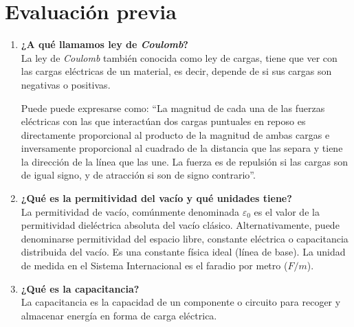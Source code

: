 \documentclass[letter,11pt]{article}
\begin{document}
\section{Evaluación previa}
\begin{enumerate}
\item \textbf{¿A qué llamamos ley de \emph{Coulomb}?} \\
La ley de \emph{Coulomb} también conocida como ley de cargas, tiene que ver con
las cargas eléctricas de un material, es decir, depende de si sus cargas son 
negativas o positivas.

Puede puede expresarse como: ``La magnitud de cada una de las fuerzas eléctricas
con las que interactúan dos cargas puntuales en reposo es directamente
proporcional al producto de la magnitud de ambas cargas e inversamente
proporcional al cuadrado de la distancia que las separa y tiene la dirección de
la línea que las une. La fuerza es de repulsión si las cargas son de igual
signo, y de atracción si son de signo contrario''.
\item \textbf{¿Qué es la permitividad del vacío y qué unidades tiene?} \\
La permitividad de vacío, comúnmente denominada $\varepsilon_0$ es el valor de
la permitividad dieléctrica absoluta del vacío clásico. Alternativamente, puede
denominarse permitividad del espacio libre, constante eléctrica o capacitancia
distribuida del vacío. Es una constante física ideal (línea de base). La unidad
de medida en el Sistema Internacional es el faradio por metro ($F/m$).
\item \textbf{¿Qué es la capacitancia?} \\
La capacitancia es la capacidad de un componente o circuito para recoger y
almacenar energía en forma de carga eléctrica.


\end{enumerate}
\end{document}
